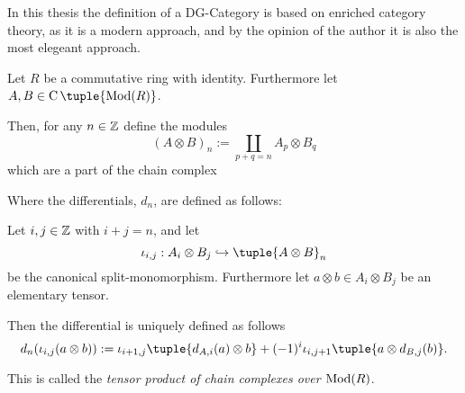 In this thesis the definition of a DG-Category is based on enriched category theory, as it is a modern approach, and by the opinion of the author it is also the most elegeant approach.

\begin{definition}
    \label{def:tensor_product_of_chain_complexes_over_Mod(R)}
    Let \( R \) be a commutative ring with identity. Furthermore let \( A, B \in \C \tuple{\Mod(R)} \).

    Then, for any  \( n \in {\mathbb{Z}} \) define the modules
    \[
        (A \otimes B)_n := \coprod_{p + q = n} A_p \otimes B_q
    \]
    which are a part of the chain complex
    \begin{center}
    \end{center}

    Where the differentials, \( d_n \), are defined as follows:
    
    Let \( i, j \in {\mathbb{Z}} \) with \( i + j = n \), and let
    \[
        \iota_{i, j}: A_i \otimes B_j \hookrightarrow \tuple{A \otimes B}_n
    \]
    be the canonical split-monomorphism. Furthermore let \( a \otimes b \in A_i \otimes B_j \) be an elementary tensor.

    Then the differential is uniquely defined as follows
    \[
        d_n(\iota_{i, j}(a \otimes b)) := \iota_{i + 1, j}\tuple{d_{A, i}(a) \otimes b} + (-1)^{i} \iota_{i, j + 1}\tuple{a \otimes d_{B, j}(b)}.
    \]

    This is called the \emph{tensor product of chain complexes over \( \operatorname{Mod}(R) \)}.
\end{definition}

